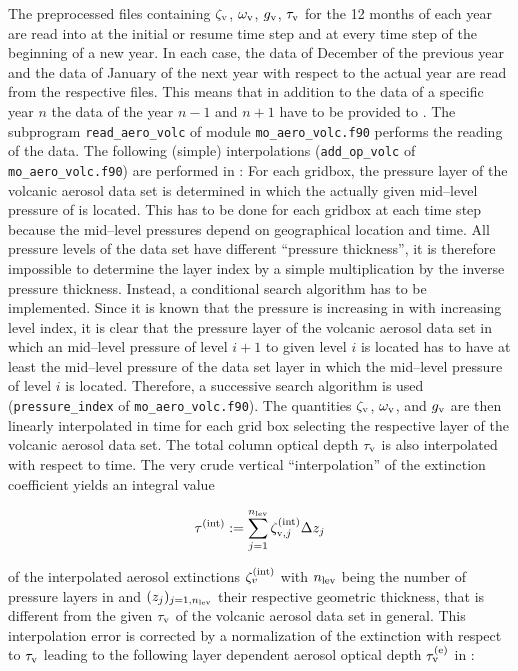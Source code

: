 \begin{appendix}
The preprocessed files containing $\zeta_{\rm v}$, $\omega_{\rm v}$, $g_{\rm v}$, 
$\tau_{\rm v}$ for the 12
months of each year are
read into \echam{} at the initial or resume time step and at every time
step of the beginning of a new year. In each case, the data of
December of the previous year and the data of January of the next year
with respect to the actual year are read from the respective
files. This means that in addition to the data of a specific year $n$
the data of the year $n-1$ and $n+1$ have to be provided to
\echam. 
The subprogram {\tt read\_aero\_volc} of module {\tt mo\_aero\_volc.f90}
performs the reading of the data.
The following (simple) 
interpolations ({\tt add\_op\_volc} of {\tt mo\_aero\_volc.f90}) are
performed in \echam: 
For each gridbox, the pressure layer of the volcanic aerosol data set
is determined in which the actually given mid--level pressure of
\echam{} is
located. This has to be done for each gridbox at each time step
because the \echam{} mid--level pressures depend on geographical
location and time. All pressure levels of the data set have different
``pressure thickness'', it is therefore impossible to determine the
layer index by a simple multiplication by the inverse pressure
thickness. Instead, a conditional search algorithm has to be
implemented. Since it is known that the pressure is increasing in
\echam{} with increasing level index, it is clear that the pressure layer
of the volcanic aerosol data set in which an \echam{} mid--level pressure
of level $i+1$ to given level $i$ is located has to have at least the
mid--level pressure of the data set layer in which the \echam{}
mid--level pressure of level $i$ is located. Therefore, a successive
search algorithm is used ({\tt pressure\_index} of {\tt mo\_aero\_volc.f90}).
The quantities $\zeta_{\rm v}$, $\omega_{\rm v}$, and $g_{\rm v}$ are
then linearly interpolated in time for each \echam{} grid 
box selecting the respective layer of the volcanic aerosol data set.
The total column optical depth $\tau_{\rm v}$ is also interpolated
with respect to time.
The very crude vertical ``interpolation'' of the extinction
coefficient yields an
integral value 

\begin{displaymath}
\tau^{(\rm int)}:=\sum\limits_{j=1}^{n_{\rm lev}}\zeta^{(\rm
  int)}_{{\rm v},j}\Delta z_j 
\end{displaymath}

of the interpolated aerosol extinctions $\zeta^{(\rm int)}_v$
with $n_{\rm lev}$ being the number of pressure layers in \echam{} and
$(z_j)_{j=1,n_{\rm lev}}$ their respective geometric thickness,
that is different from the given $\tau_{\rm v}$ of the volcanic
aerosol data set in general. This interpolation error is corrected by 
a normalization of the extinction with respect to $\tau_{\rm v}$
leading to the following layer dependent aerosol optical depth
$\tau^{(\rm e)}_{\rm v}$ in
\echam:


\end{appendix}
